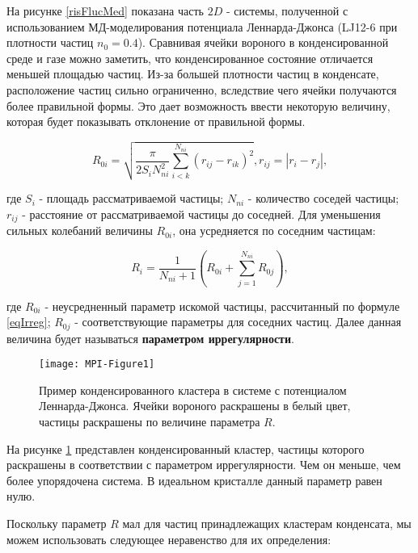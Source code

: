 На рисунке \ref{risFlucMed} показана часть $2D$ - системы, полученной с использованием МД-моделирования потенциала Леннарда-Джонса (LJ12-6 при плотности частиц $n_0 = 0.4$).
Сравнивая ячейки вороного в конденсированной среде и газе можно заметить, что конденсированное состояние отличается меньшей площадью частиц. Из-за большей плотности частиц в конденсате, расположение частиц сильно ограниченно, вследствие чего ячейки получаются более правильной формы. Это дает возможность ввести некоторую величину, которая будет показывать отклонение от правильной формы.

\begin{equation}
	R_{0i} = \sqrt{\frac{\pi}{2 S_i N_{ni}^2} \sum\limits_{i<k}^{N_{ni}} (r_{ij} - r_{ik})^2}, r_{ij} = |r_i - r_j|,
\end{equation}

где $S_i$ - площадь рассматриваемой частицы; $N_{ni}$ - количество соседей частицы; $r_{ij}$ - расстояние от рассматриваемой частицы до соседней.
Для уменьшения сильных колебаний величины $R_{0i}$, она усредняется по соседним частицам:

\begin{equation}\label{eqIrreg}
R_i = \frac{1}{N_{ni} + 1} \left( R_{0i} + \sum\limits_{j=1}^{N_{ni}} R_{0j} \right),
\end{equation}

где $R_{0i}$ - неусредненный параметр искомой частицы, рассчитанный по формуле \ref{eqIrreg}; $R_{0j}$ - соответствующие параметры для соседних частиц.  
Далее данная величина будет называться \textbf{параметром иррегулярности}.

\begin{figure}[h]
\begin{center}
\texttt{[image: MPI-Figure1]}
\caption{Пример конденсированного кластера в системе с потенциалом Леннарда-Джонса. Ячейки вороного раскрашены в белый цвет, частицы раскрашены по величине параметра $R$.}
\label{risIrreg}
\end{center}
\end{figure}

На рисунке \ref{risIrreg} представлен конденсированный кластер, частицы которого раскрашены в соответствии с параметром иррегулярности. Чем он меньше, чем более упорядочена система. В идеальном кристалле данный параметр равен нулю.

Поскольку параметр $R$ мал для частиц принадлежащих кластерам конденсата, мы можем использовать следующее неравенство для их определения:

